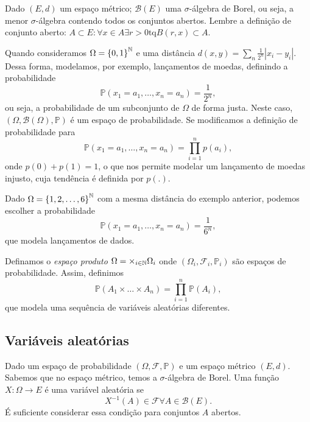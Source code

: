 \begin{eg}
    Dado $\left( E,d \right) $ um espaço métrico; $\mathcal{B}\left( E \right) $ uma $\sigma$-álgebra de Borel, ou seja, a menor $\sigma$-álgebra contendo todos os conjuntos abertos. Lembre a definição de conjunto aberto: $A\subset E: \forall x\in A \exists r>0 \text{tq} B\left( r, x \right) \subset A $.
\end{eg}
\begin{eg}
    Quando consideramos $\Omega = \left\{ 0,1 \right\}^{\mathbb{N}} $ e uma distância $d\left( x,y \right) =\sum_{n} \frac{1}{2^{n}}|x_i-y_i|$. Dessa forma, modelamos, por exemplo, lançamentos de moedas, definindo a probabilidade \[
    \mathbb{P}\left( x_1=a_1,\ldots,x_n=a_n \right) = \frac{1}{2^{n}}
    ,\] ou seja, a probabilidade de um subconjunto de $\Omega$ de forma justa. Neste caso, $\left( \Omega, \mathcal{B}\left( \Omega \right) , \mathbb{P} \right) $ é um espaço de probabilidade. Se modificamos a definição de probabilidade para \[
    \mathbb{P}\left( x_1=a_1,\ldots,x_n=a_n \right)  = \prod_{i=1}^{n} p\left( a_i \right)  
,\] onde $p(0) + p(1) = 1$, o que nos permite modelar um lançamento de moedas injusto, cuja tendência é definida por $p(.)$.
\end{eg}
\begin{eg}
    Dado $\Omega = \left\{ 1,2,\ldots,6 \right\}^{\mathbb{N}}$ com a mesma distância do exemplo anterior, podemos escolher a probabilidade \[
    \mathbb{P}\left( x_1=a_1,\ldots,x_n=a_n \right) =\frac{1}{6^{n}}
    ,\] que modela lançamentos de dados.
\end{eg}
\begin{eg}
    Definamos o \emph{espaço produto} $\Omega = \times_{i\in \mathbb{N}} \Omega_i$ onde $\left( \Omega_i, \mathcal{F}_i, \mathbb{P}_i \right) $ são espaços de probabilidade. Assim, definimos \[
    \mathbb{P}\left( A_1\times \ldots\times A_n \right) = \prod_{i=1}^{n} \mathbb{P}\left( A_i \right)  
    ,\] que modela uma sequência de variáveis aleatórias diferentes.
\end{eg}

\subsection*{Variáveis aleatórias}

Dado um espaço de probabilidade $\left( \Omega, \mathcal{F}, \mathbb{P} \right) $ e um espaço métrico $\left( E, d \right) $. Sabemos que no espaço métrico, temos a $\sigma$-álgebra de Borel. Uma função $X:\Omega \to E$ é uma variável aleatória se \[
X^{-1}\left( A \right) \in \mathcal{F} \forall A\in \mathcal{B}\left( E \right) 
.\] É suficiente considerar essa condição para conjuntos $A$ abertos.

